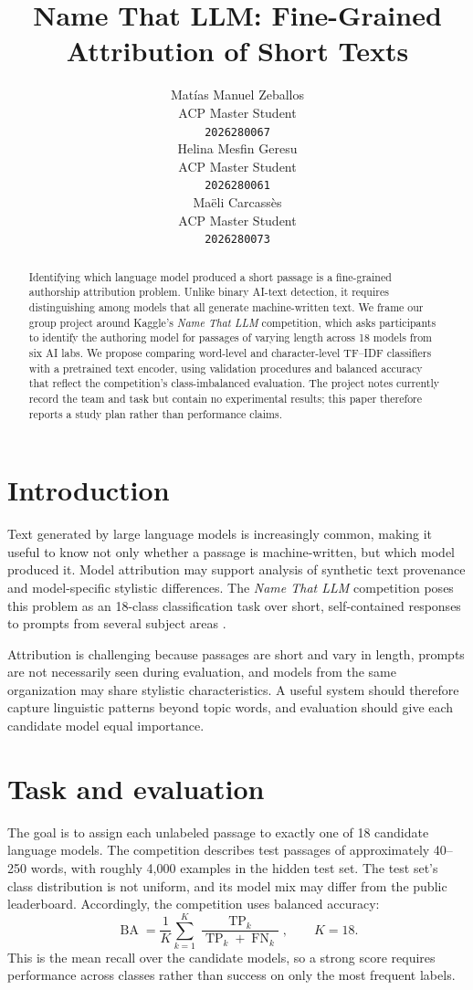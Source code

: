 \documentclass{article}
\title{Name That LLM: Fine-Grained Attribution of Short Texts}
\author{%
  Mat\'ias Manuel Zeballos \\
  ACP Master Student\\
  \texttt{2026280067} \\
  \And
  Helina Mesfin Geresu \\
  ACP Master Student\\
  \texttt{2026280061} \\
  \And
  Ma\"eli Carcass\`es \\
  ACP Master Student\\
  \texttt{2026280073} \\
}
\begin{document}
\maketitle

\begin{abstract}
Identifying which language model produced a short passage is a fine-grained authorship attribution problem. Unlike binary AI-text detection, it requires distinguishing among models that all generate machine-written text. We frame our group project around Kaggle's \textit{Name That LLM} competition, which asks participants to identify the authoring model for passages of varying length across 18 models from six AI labs. We propose comparing word-level and character-level TF--IDF classifiers with a pretrained text encoder, using validation procedures and balanced accuracy that reflect the competition's class-imbalanced evaluation. The project notes currently record the team and task but contain no experimental results; this paper therefore reports a study plan rather than performance claims.
\end{abstract}

\section{Introduction}
Text generated by large language models is increasingly common, making it useful to know not only whether a passage is machine-written, but which model produced it. Model attribution may support analysis of synthetic text provenance and model-specific stylistic differences. The \textit{Name That LLM} competition poses this problem as an 18-class classification task over short, self-contained responses to prompts from several subject areas \citep{yan2026namethatllm}.

Attribution is challenging because passages are short and vary in length, prompts are not necessarily seen during evaluation, and models from the same organization may share stylistic characteristics. A useful system should therefore capture linguistic patterns beyond topic words, and evaluation should give each candidate model equal importance.

\section{Task and evaluation}
The goal is to assign each unlabeled passage to exactly one of 18 candidate language models. The competition describes test passages of approximately 40--250 words, with roughly 4,000 examples in the hidden test set. The test set's class distribution is not uniform, and its model mix may differ from the public leaderboard. Accordingly, the competition uses balanced accuracy:
\begin{equation}
  \operatorname{BA} = \frac{1}{K} \sum_{k=1}^{K}
  \frac{\operatorname{TP}_k}{\operatorname{TP}_k + \operatorname{FN}_k},
  \qquad K=18.
\end{equation}
This is the mean recall over the candidate models, so a strong score requires performance across classes rather than success on only the most frequent labels.
\end{document}

